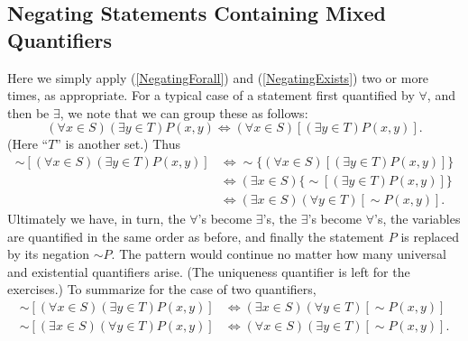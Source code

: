 \subsection{Negating Statements Containing Mixed Quantifiers}
Here we simply apply (\ref{NegatingForall}) and (\ref{NegatingExists})
two or more times, as appropriate.  For a typical case of a statement
first quantified by $\forall$, and then be $\exists$,
we note that we can group these as follows:\footnotemark
$$(\forall x\in S)(\exists y\in T)P(x,y)
\iff(\forall x\in S)[(\exists y\in T)P(x,y)].$$
(Here ``$T$'' is another set.)  Thus 
\begin{align*}
\sim[(\forall x\in S)(\exists y\in T)P(x,y)]
&\iff
  \sim\{(\forall x\in S)[(\exists y\in T)P(x,y)]\}\\
&\iff
   (\exists x\in S)\{\sim[(\exists y\in T)P(x,y)]\}\\
&\iff
   (\exists x\in S)(\forall y\in T)[\sim P(x,y)].\end{align*}
Ultimately  we have, in turn, 
the $\forall$'s become $\exists$'s,
the $\exists$'s  become $\forall$'s,
the variables are quantified in the same order as before,
and finally the statement $P$ is replaced by its negation $\sim P$.
The pattern would continue no matter how many universal and
existential quantifiers arise.  (The uniqueness quantifier
is left for the exercises.)
To summarize for the case of two quantifiers,
\begin{align}
\sim[(\forall x\in S)(\exists y\in T)P(x,y)]
&\iff(\exists x\in S)(\forall y\in T)[\sim P(x,y)]\\
\sim[(\exists x\in S)(\forall y\in T)P(x,y)]
&\iff(\forall x\in S)(\exists y\in T)[\sim P(x,y)].\end{align}

